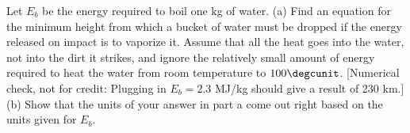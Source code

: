 Let $E_b$ be the energy required to boil one kg of water.
(a) \answercheck
 Find an equation for the minimum height from which a
bucket of water must be dropped if the energy released on
impact is to vaporize it. Assume that all the heat goes into
the water, not into the dirt it strikes, and ignore the
relatively small amount of energy required to heat the water
from room temperature to $100\degcunit$. [Numerical check, not
for credit: Plugging in $E_b=2.3$ MJ/kg should give a result
of 230 km.]\hwendpart
 (b) Show that the units of your answer in part a
come out right based on the units given for $E_b$.
